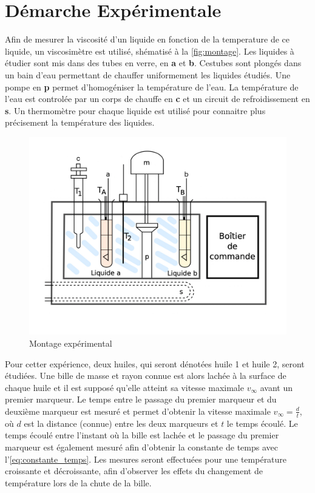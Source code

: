 \section{Démarche Expérimentale}

Afin de mesurer la viscosité d'un liquide en fonction de la temperature de ce liquide, un viscosimètre est utilisé, shématisé à la \autoref{fig:montage}. Les liquides à étudier sont mis dans des tubes en verre, en \textbf{a} et \textbf{b}. Cestubes sont plongés dans un bain d'eau permettant de chauffer uniformement les liquides étudiés. Une pompe en \textbf{p} permet d'homogéniser la température de l'eau. La température de l'eau est controlée par un corps de chauffe en \textbf{c} et un circuit de refroidissement en \textbf{s}. Un thermomètre pour chaque liquide est utilisé pour connaitre plus précisement la température des liquides.

\begin{figure}[h]
    \centering
    \includegraphics[width=0.8\linewidth]{figures/montage.png}
    \caption{Montage expérimental \cite{notice}}
    \label{fig:montage}
\end{figure}

Pour cetter expérience, deux huiles, qui seront dénotées huile 1 et huile 2, seront étudiées. Une bille de masse et rayon connue est alors lachée à la surface de chaque huile et il est supposé qu'elle atteint sa vitesse maximale \(v_\infty\) avant un premier marqueur. Le temps entre le passage du premier marqueur et du deuxième marqueur est mesuré et permet d'obtenir la vitesse maximale \(v_\infty = \frac{d}{t}\), où \(d\) est la distance (connue) entre les deux marqueurs et \(t\) le temps écoulé. Le temps écoulé entre l'instant où la bille est lachée et le passage du premier marqueur est également mesuré afin d'obtenir la constante de temps avec l'\autoref{eq:constante_temps}. Les mesures seront effectuées pour une température croissante et décroissante, afin d'observer les effets du changement de température lors de la chute de la bille.
